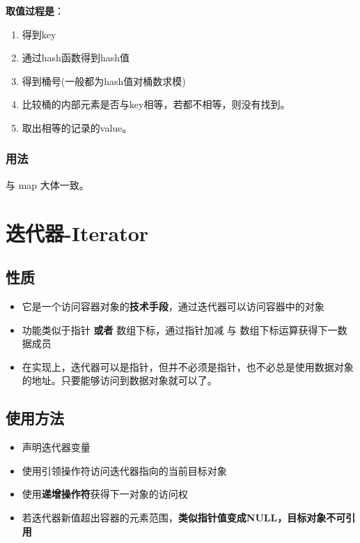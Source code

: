 \documentclass[UTF8,a4paper,12pt]{ctexbook}
\begin{document}
			\textbf{取值过程是}：
				\begin{enumerate}[itemindent = 1em]
					\item 得到key
					\item 通过hash函数得到hash值
					\item 得到桶号(一般都为hash值对桶数求模)
					\item 比较桶的内部元素是否与key相等，若都不相等，则没有找到。
					\item 取出相等的记录的value。
				\end{enumerate}
		\subsection{用法}
			与 map 大体一致。


\chapter{迭代器-Iterator}
	\section{性质}
		\begin{itemize}
			\item 它是一个访问容器对象的\textbf{技术手段}，通过迭代器可以访问容器中的对象
			\item 功能类似于指针 \textbf{或者}  数组下标，通过指针加减 与 数组下标运算获得下一数据成员

			\item 在实现上，迭代器可以是指针，但并不必须是指针，也不必总是使用数据对象的地址。只要能够访问到数据对象就可以了。
		\end{itemize}
	
	

	\section{使用方法}
		\begin{itemize}
			\item 声明迭代器变量
			
			\item 使用引领操作符访问迭代器指向的当前目标对象
			
			\item 使用\textbf{递增操作符}获得下一对象的访问权
			
			\item 若迭代器新值超出容器的元素范围，\textbf{类似指针值变成NULL，目标对象不可引用}
		\end{itemize}
		
\end{document}
